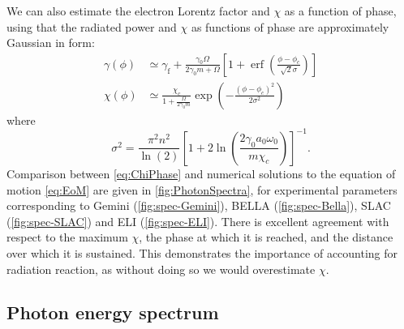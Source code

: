 \documentclass[reprint,superscriptaddress,amsmath,amssymb,aps,pra]{revtex4-1}
\newcommand{\lnTwo}{\ln(2)}
\DeclareMathOperator\erf{erf}
\begin{document}
We can also estimate the electron Lorentz factor and $\chi$ as a function
of phase, using that the radiated power and $\chi$ as functions of phase are
approximately Gaussian in form:
	\begin{align}
	\gamma(\phi) &\simeq
		\gamma_\mathrm{f} +
		\frac{\gamma_0 \Omega}{2 \gamma_0 m + \Omega}
		\left[
			1 + \erf\!\left(
				\frac{\phi-\phi_c}{\sqrt{2}\sigma}
				\right)
		\right]
	\label{eq:GammaPhase}
	\\
	\chi(\phi) &\simeq
		\frac{\chi_c}{1 + \frac{\Omega}{2 \gamma_0 m}}
		\exp\!\left( -\frac{(\phi-\phi_c)^2}{2 \sigma^2} \right)
	\label{eq:ChiPhase}
	\end{align}
where
	\begin{equation}
	\sigma^2 =
		\frac{\pi^2 n^2}{\lnTwo}
		\left[
			1 + 2 \ln\!\left( \frac{2\gamma_0 a_0 \omega_0}{m \chi_c} \right)
		\right]^{-1}.
	\end{equation}
Comparison between \cref{eq:ChiPhase} and numerical solutions to
the equation of motion \cref{eq:EoM} are given in \cref{fig:PhotonSpectra},
for experimental parameters corresponding to Gemini (\cref{fig:spec-Gemini}),
BELLA (\cref{fig:spec-Bella}),
SLAC (\cref{fig:spec-SLAC}) and ELI (\cref{fig:spec-ELI}). There is
excellent agreement with respect to the maximum $\chi$, the phase at which it
is reached, and the distance over which it is sustained.
This demonstrates the importance of accounting for radiation reaction,
as without doing so we would overestimate $\chi$.

\subsection{Photon energy spectrum}
\label{sec:PhotonSpectrum}
\end{document}
